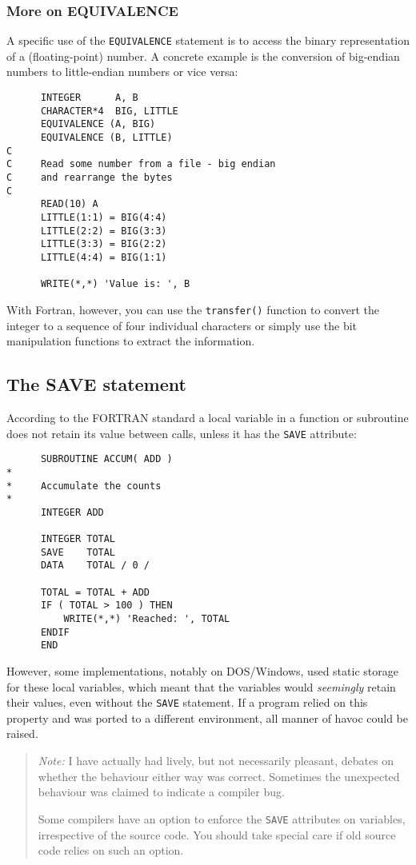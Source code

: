\subsubsection{More on EQUIVALENCE}
A specific use of the \verb+EQUIVALENCE+ statement is to access
the binary representation of a (floating-point) number. A concrete
example is the conversion of big-endian numbers to little-endian
numbers or vice versa:
%
\begin{verbatim}
      INTEGER      A, B
      CHARACTER*4  BIG, LITTLE
      EQUIVALENCE (A, BIG)
      EQUIVALENCE (B, LITTLE)
C
C     Read some number from a file - big endian
C     and rearrange the bytes
C
      READ(10) A
      LITTLE(1:1) = BIG(4:4)
      LITTLE(2:2) = BIG(3:3)
      LITTLE(3:3) = BIG(2:2)
      LITTLE(4:4) = BIG(1:1)

      WRITE(*,*) 'Value is: ', B
\end{verbatim}

With Fortran, however, you can use the \verb+transfer()+ function to
convert the integer to a sequence of four individual characters or
simply use the bit manipulation functions to extract the information.


\subsection{The SAVE statement}
According to the FORTRAN standard a local variable in a function or
subroutine does not retain its value between calls, unless it has the
\verb+SAVE+ attribute:
%
\begin{verbatim}
      SUBROUTINE ACCUM( ADD )
*
*     Accumulate the counts
*
      INTEGER ADD

      INTEGER TOTAL
      SAVE    TOTAL
      DATA    TOTAL / 0 /

      TOTAL = TOTAL + ADD
      IF ( TOTAL > 100 ) THEN
          WRITE(*,*) 'Reached: ', TOTAL
      ENDIF
      END
\end{verbatim}

However, some implementations, notably on DOS/Windows, used static
storage for these local variables, which meant that the variables would
\emph{seemingly} retain their values, even without the \verb+SAVE+ statement.
If a program relied on this property and was ported to a different environment,
all manner of havoc could be raised.

\begin{quote}
\emph{Note:} I have actually had lively, but not necessarily pleasant, debates on
whether the behaviour either way was correct. Sometimes the unexpected
behaviour was claimed to indicate a compiler bug.

Some compilers have an option to enforce the \verb+SAVE+ attributes on variables,
irrespective of the source code. You should take special care if old source code
relies on such an option.
\end{quote}

